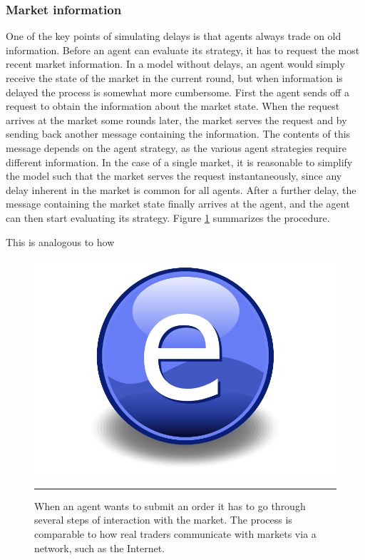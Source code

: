 \subsubsection{Market information}
One of the key points of simulating delays is that agents always trade on old information. Before an agent can evaluate its strategy, it has to request the most recent market information. In a model without delays, an agent would simply receive the state of the market in the current round, but when information is delayed the process is somewhat more cumbersome. First the agent sends off a request to obtain the information about the market state. When the request arrives at the market some rounds later, the market serves the request and by sending back another message containing the information. The contents of this message depends on the agent strategy, as the various agent strategies require different information. 
In the case of a single market, it is reasonable to simplify the model such that the market serves the request instantaneously, since any delay inherent in the market is common for all agents. 
After a further delay, the message containing the market state finally arrives at the agent, and the agent can then start evaluating its strategy. Figure \ref{fig:information_exchange} summarizes the procedure.

This is analogous to how 
\begin{figure}[htbp]
	\centering
		\includegraphics{Figures/Electron.pdf}
		\rule{35em}{0.5pt}
	\caption{When an agent wants to submit an order it has to go through several steps of interaction with the market. The process is comparable to how real traders communicate with markets via a network, such as the Internet.}
	\label{fig:information_exchange}
\end{figure}


